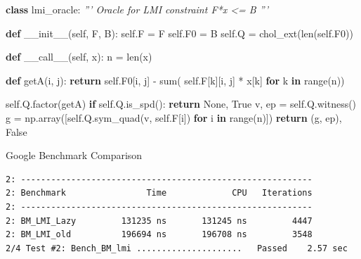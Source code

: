 \documentclass[
  ignorenonframetext,
  aspectratio=169,
  serif,onlymath]{beamer}
\newenvironment{Shaded}{}{}
\newcommand{\BuiltInTok}[1]{#1}
\newcommand{\CommentTok}[1]{\textcolor[rgb]{0.38,0.63,0.69}{\textit{#1}}}
\newcommand{\ControlFlowTok}[1]{\textcolor[rgb]{0.00,0.44,0.13}{\textbf{#1}}}
\newcommand{\FunctionTok}[1]{\textcolor[rgb]{0.02,0.16,0.49}{#1}}
\newcommand{\KeywordTok}[1]{\textcolor[rgb]{0.00,0.44,0.13}{\textbf{#1}}}
\newcommand{\NormalTok}[1]{#1}
\newcommand{\OperatorTok}[1]{\textcolor[rgb]{0.40,0.40,0.40}{#1}}
\newcommand{\VariableTok}[1]{\textcolor[rgb]{0.10,0.09,0.49}{#1}}
\begin{document}
\begin{frame}[fragile]

\scriptsize

\begin{Shaded}
\begin{Highlighting}[]
\KeywordTok{class}\NormalTok{ lmi_oracle:}
    \CommentTok{''' Oracle for LMI constraint F*x <= B '''}

    \KeywordTok{def} \FunctionTok{__init__}\NormalTok{(}\VariableTok{self}\NormalTok{, F, B):}
        \VariableTok{self}\NormalTok{.F }\OperatorTok{=}\NormalTok{ F}
        \VariableTok{self}\NormalTok{.F0 }\OperatorTok{=}\NormalTok{ B}
        \VariableTok{self}\NormalTok{.Q }\OperatorTok{=}\NormalTok{ chol_ext(}\BuiltInTok{len}\NormalTok{(}\VariableTok{self}\NormalTok{.F0))}

    \KeywordTok{def} \FunctionTok{__call__}\NormalTok{(}\VariableTok{self}\NormalTok{, x):}
\NormalTok{        n }\OperatorTok{=} \BuiltInTok{len}\NormalTok{(x)}

        \KeywordTok{def}\NormalTok{ getA(i, j):}
            \ControlFlowTok{return} \VariableTok{self}\NormalTok{.F0[i, j] }\OperatorTok{-} \BuiltInTok{sum}\NormalTok{(}
                \VariableTok{self}\NormalTok{.F[k][i, j] }\OperatorTok{*}\NormalTok{ x[k] }\ControlFlowTok{for}\NormalTok{ k }\KeywordTok{in} \BuiltInTok{range}\NormalTok{(n))}

        \VariableTok{self}\NormalTok{.Q.factor(getA)}
        \ControlFlowTok{if} \VariableTok{self}\NormalTok{.Q.is_spd():}
            \ControlFlowTok{return} \VariableTok{None}\NormalTok{, }\VariableTok{True}
\NormalTok{        v, ep }\OperatorTok{=} \VariableTok{self}\NormalTok{.Q.witness()}
\NormalTok{        g }\OperatorTok{=}\NormalTok{ np.array([}\VariableTok{self}\NormalTok{.Q.sym_quad(v, }\VariableTok{self}\NormalTok{.F[i])}
                      \ControlFlowTok{for}\NormalTok{ i }\KeywordTok{in} \BuiltInTok{range}\NormalTok{(n)])}
        \ControlFlowTok{return}\NormalTok{ (g, ep), }\VariableTok{False}
\end{Highlighting}
\end{Shaded}

\end{frame}

\begin{frame}[fragile]{Google Benchmark Comparison}
\protect\hypertarget{google-benchmark-comparison}{}

\begin{verbatim}
2: ----------------------------------------------------------
2: Benchmark                Time             CPU   Iterations
2: ----------------------------------------------------------
2: BM_LMI_Lazy         131235 ns       131245 ns         4447
2: BM_LMI_old          196694 ns       196708 ns         3548
2/4 Test #2: Bench_BM_lmi .....................   Passed    2.57 sec
\end{verbatim}

\end{frame}
\end{document}
